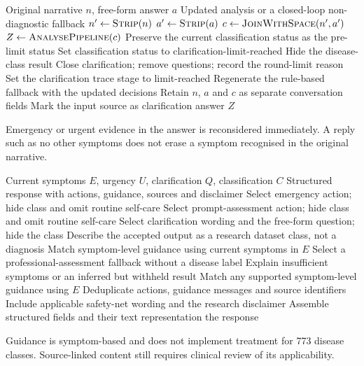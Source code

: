 \documentclass[11pt,a4paper]{article}
\begin{document}
\newpage
\begin{algorithm}[H]
\caption{Process one clarification answer without losing the original context}
\label{alg:followup}
\begin{algorithmic}[1]
\Require Original narrative $n$, free-form answer $a$
\Ensure Updated analysis or a closed-loop non-diagnostic fallback
\State $n'\gets\Call{Strip}{n}$
\State $a'\gets\Call{Strip}{a}$
\State $c\gets\Call{JoinWithSpace}{n',a'}$
\State $Z\gets\Call{AnalysePipeline}{c}$
  \State Preserve the current classification status as the pre-limit status
  \State Set classification status to clarification-limit-reached
  \State Hide the disease-class result
  \State Close clarification; remove questions; record the round-limit reason
  \State Set the clarification trace stage to limit-reached
  \State Regenerate the rule-based fallback with the updated decisions
\EndIf
\State Retain $n$, $a$ and $c$ as separate conversation fields
\State Mark the input source as clarification answer
\State \Return $Z$
\end{algorithmic}
\end{algorithm}
Emergency or urgent evidence in the answer is reconsidered immediately. A reply
such as no other symptoms does not erase a symptom recognised in the original narrative.

\newpage
\begin{algorithm}[H]
\caption{Select deterministic response content from pipeline state}
\label{alg:response}
\begin{algorithmic}[1]
\Require Current symptoms $E$, urgency $U$, clarification $Q$, classification $C$
\Ensure Structured response with actions, guidance, sources and disclaimer
  \State Select emergency action; hide class and omit routine self-care
  \State Select prompt-assessment action; hide class and omit routine self-care
  \State Select clarification wording and the free-form question; hide the class
  \State Describe the accepted output as a research dataset class, not a diagnosis
  \State Match symptom-level guidance using current symptoms in $E$
\Else
  \State Select a professional-assessment fallback without a disease label
    \State Explain insufficient symptoms or an inferred but withheld result
    \State Match any supported symptom-level guidance using $E$
  \EndIf
\EndIf
\State Deduplicate actions, guidance messages and source identifiers
\State Include applicable safety-net wording and the research disclaimer
\State Assemble structured fields and their text representation
\State \Return the response
\end{algorithmic}
\end{algorithm}
Guidance is symptom-based and does not implement treatment for 773 disease
classes. Source-linked content still requires clinical review of its applicability.
\end{document}
